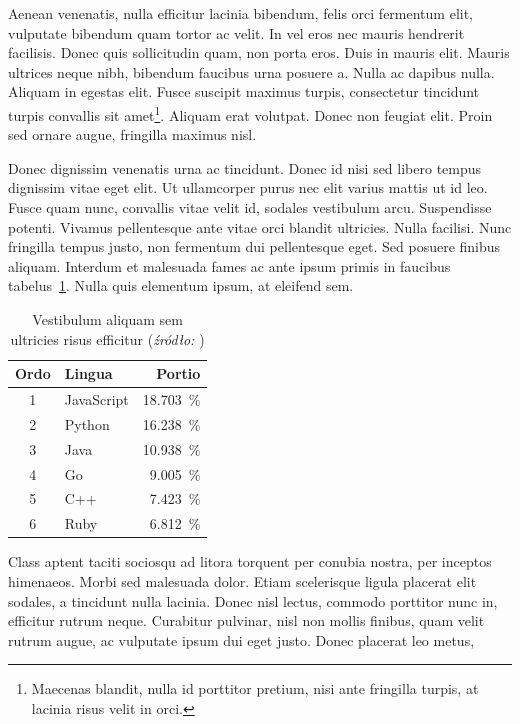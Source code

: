 \documentclass[polish,engineering]{wizthesis}
\begin{document}
Aenean venenatis, nulla efficitur lacinia bibendum, felis orci fermentum elit,
vulputate bibendum quam tortor ac velit. In vel eros nec mauris hendrerit
facilisis. Donec quis sollicitudin quam, non porta eros. Duis in mauris elit.
Mauris ultrices neque nibh, bibendum faucibus urna posuere a. Nulla ac dapibus
nulla. Aliquam in egestas elit. Fusce suscipit maximus turpis, consectetur
tincidunt turpis convallis sit amet\footnote{Maecenas blandit, nulla id
porttitor pretium, nisi ante fringilla turpis, at lacinia risus velit in orci.}.
Aliquam erat volutpat. Donec non feugiat elit. Proin sed ornare augue, fringilla
maximus nisl.

Donec dignissim venenatis urna ac tincidunt. Donec id nisi sed libero tempus
dignissim vitae eget elit. Ut ullamcorper purus nec elit varius mattis ut id
leo. Fusce quam nunc, convallis vitae velit id, sodales vestibulum arcu.
Suspendisse potenti. Vivamus pellentesque ante vitae orci blandit ultricies.
Nulla facilisi. Nunc fringilla tempus justo, non fermentum dui pellentesque
eget. Sed posuere finibus aliquam. Interdum et malesuada fames ac ante ipsum
primis in faucibus tabelus~\ref{tab:jezyki}. Nulla quis elementum ipsum, at
eleifend sem.
\begin{table}[ht]
  \centering
  \caption{Vestibulum aliquam sem ultricies risus efficitur
  (\textit{źródło: \cite{latexcompanion}})}
  \label{tab:jezyki}
  \begin{tabular}{@{}clr@{}}
    \toprule
    Ordo & Lingua     & Portio                \\ \midrule
    1    & JavaScript & \SI{18.703}{\percent} \\
    2    & Python     & \SI{16.238}{\percent} \\
    3    & Java       & \SI{10.938}{\percent} \\
    4    & Go         & \SI{9.005}{\percent}  \\
    5    & C++        & \SI{7.423}{\percent}  \\
    6    & Ruby       & \SI{6.812}{\percent}  \\ \bottomrule
  \end{tabular}
\end{table}
Class aptent taciti sociosqu ad litora torquent per conubia nostra, per inceptos
himenaeos. Morbi sed malesuada dolor. Etiam scelerisque ligula placerat elit
sodales, a tincidunt nulla lacinia. Donec nisl lectus, commodo porttitor nunc
in, efficitur rutrum neque. Curabitur pulvinar, nisl non mollis finibus, quam
velit rutrum augue, ac vulputate ipsum dui eget justo. Donec placerat leo metus,
\end{document}
